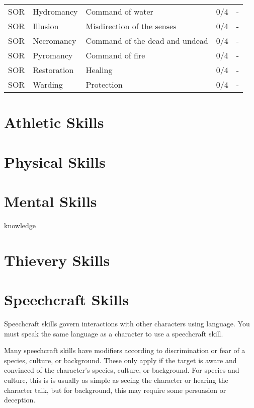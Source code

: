 \begin{center}
\begin{xltabular}{\textwidth}{l l X l l}
        SOR & Hydromancy & Command of water & 0/4 & - \\
        SOR & Illusion & Misdirection of the senses & 0/4 & - \\
        SOR & Necromancy & Command of the dead and undead & 0/4 & - \\
        SOR & Pyromancy & Command of fire & 0/4 & - \\
        SOR & Restoration & Healing & 0/4 & - \\
        SOR & Warding & Protection & 0/4 & - \\
    \end{xltabular}
\end{center}

\begin{multicols*}{2}

    \section{Athletic Skills}

    \section{Physical Skills}

    \section{Mental Skills}
    {knowledge}

    \section{Thievery Skills}

    \section{Speechcraft Skills}\label{speechcraft-skills}
    Speechcraft skills govern interactions with other characters using language.
    You must speak the same language as a character to use a speechcraft skill.

    Many speechcraft skills have modifiers according to discrimination or fear of
    a species, culture, or background. These only apply if the target is aware and
    convinced of the character's species, culture, or background. For species and
    culture, this is is usually as simple as seeing the character or hearing the
    character talk, but for background, this may require some persuasion or
    deception.


\end{multicols*}
